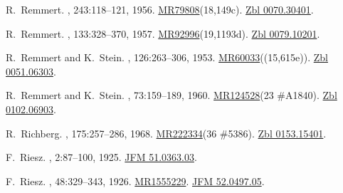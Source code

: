 \documentclass[11pt,a4paper, final, twoside]{article}
\numberwithin{equation}{section}
\begin{document}
\begin{appendices}
\begin{thebibliography}{100}
R.~Remmert.
, 243:118--121, 1956.
\newblock
  \href{http://www.ams.org/mathscinet-getitem?mr=79808}{MR79808}(18,149c).
  \href{http://zbmath.org/?q=an:0070.30401}{Zbl 0070.30401}.

R.~Remmert.
, 133:328--370, 1957.
\newblock
  \href{http://www.ams.org/mathscinet-getitem?mr=92996}{MR92996}(19,1193d).
  \href{http://zbmath.org/?q=an:0079.10201}{Zbl 0079.10201}.

R.~Remmert and K.~Stein.
, 126:263--306, 1953.
\newblock
  \href{http://www.ams.org/mathscinet-getitem?mr=60033}{MR60033}((15,615e)).
  \href{http://zbmath.org/?q=an:0051.06303}{Zbl 0051.06303}.

R.~Remmert and K.~Stein.
, 73:159--189, 1960.
\newblock \href{http://www.ams.org/mathscinet-getitem?mr=124528}{MR124528}(23
  \#A1840). \href{http://zbmath.org/?q=an:0102.06903}{Zbl 0102.06903}.

R.~Richberg.
, 175:257--286, 1968.
\newblock \href{http://www.ams.org/mathscinet-getitem?mr=222334}{MR222334}(36
  \#5386). \href{http://zbmath.org/?q=an:0153.15401}{Zbl 0153.15401}.

F.~Riesz.
, 2:87--100, 1925.
\newblock \href{http://zbmath.org/?q=an:51.0363.03}{JFM 51.0363.03}.

F.~Riesz.
, 48:329--343, 1926.
\newblock \href{http://www.ams.org/mathscinet-getitem?mr=1555229}{MR1555229}.
  \href{http://zbmath.org/?q=an:52.0497.05}{JFM 52.0497.05}.


\end{thebibliography}
\end{appendices}
\end{document}
